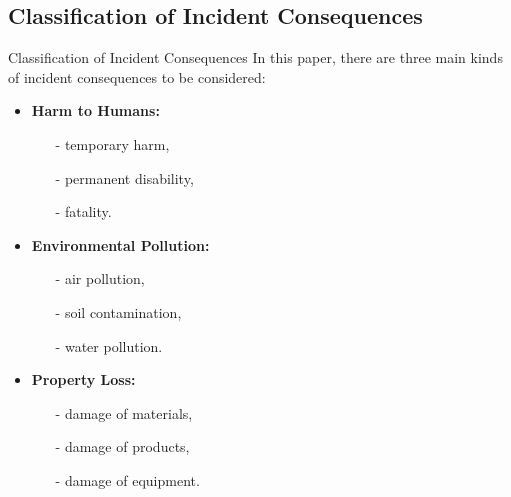 \subsection{Classification of Incident Consequences}
\begin{frame}{Classification of Incident Consequences}
    \label{Dynamic Risk Assessment: Classification of Incident Consequences}
    In this paper, there are three main kinds of incident consequences to be considered:
    \begin{itemize}
      \item \textbf{Harm to Humans:}\\[-5pt]
      \begin{itemize}
        \item[-] temporary harm,
        \item[-] permanent disability,
        \item[-] fatality.
      \end{itemize}
      \item \textbf{Environmental Pollution:}\\[-5pt]
      \begin{itemize}
        \item[-] air pollution,
        \item[-] soil contamination,
        \item[-] water pollution.
      \end{itemize}
      \item \textbf{Property Loss:}\\[-5pt]
      \begin{itemize}
        \item[-] damage of materials,
        \item[-] damage of products,
        \item[-] damage of equipment.
      \end{itemize}
    \end{itemize}
\end{frame}

